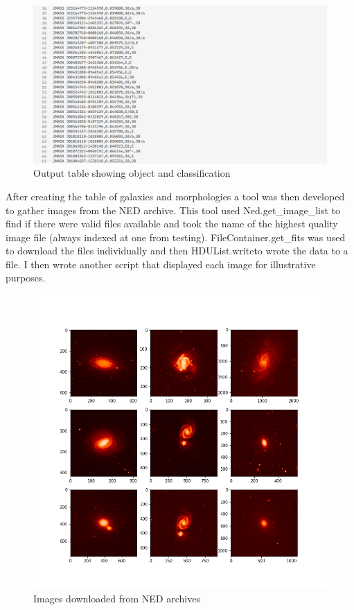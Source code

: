 \documentclass[12pt,runningheads]{llncs}
\begin{document}
\begin{figure}[h]
    \includegraphics[scale=0.3]{Screenshot_2024-02-01_03-39-05.png}
    \centering
    \caption{Output table showing object and classification}\label{tab1}
\end{figure}

\newpage

After creating the table of galaxies and morphologies a tool was then developed to gather
images from the NED archive. This tool used Ned.get\_image\_list to find if there were valid
files available and took the name of the highest quality image file (always indexed at one
from testing). FileContainer.get\_fits was used to download the files individually and then
HDUList.writeto wrote the data to a file. I then wrote another script that displayed each
image for illustrative purposes.

\begin{figure}[h]
    \includegraphics[scale=0.4]{Figure_1.png}
    \centering
    \caption{Images downloaded from NED archives}\label{tab1}
\end{figure}
\end{document}
